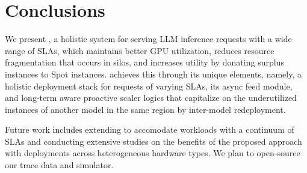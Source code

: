 \section{Conclusions }
\label{sec:conclude}

We present \sys, a holistic system for serving LLM inference requests with a wide range of SLAs, which maintains better GPU utilization, reduces resource fragmentation that occurs in silos, and increases utility by donating surplus instances to Spot instances. 
\sys achieves this through its unique elements, namely, a holistic deployment stack for requests of varying SLAs, its async feed module, and long-term aware proactive scaler logics that capitalize on the underutilized instances of another model in the same region by inter-model redeployment.

Future work includes extending \sys to accomodate workloads with a continuum of SLAs and conducting extensive studies on the benefits of the proposed approach with deployments across heterogeneous hardware types. We plan to open-source our trace data and simulator.


% 



